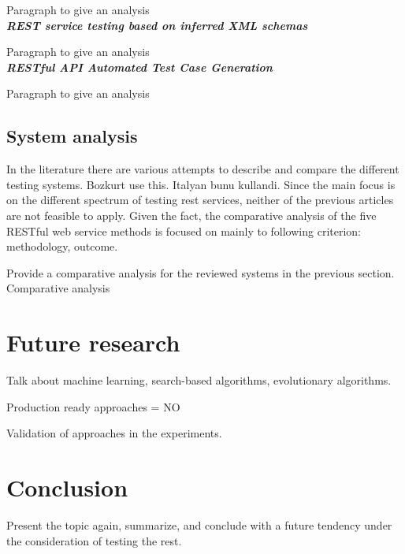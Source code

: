 \documentclass[english]{tktltiki}
\begin{document}
Paragraph to give an analysis 
\\

\textit{\textbf{REST service testing based on inferred XML schemas \cite{navas2014rest}}}

Paragraph to give an analysis 
\\

\textit{\textbf{RESTful API Automated Test Case Generation \cite{arcuri2017restful}}}

Paragraph to give an analysis

\subsection{System analysis}
In the literature there are various attempts to describe and compare the different testing systems. Bozkurt use this. Italyan bunu kullandi. Since the main focus is on the different spectrum of testing rest services, neither of the previous articles are not feasible to apply. Given the fact, the comparative analysis of the five RESTful web service methods is focused on mainly to following criterion: methodology, outcome.

Provide a comparative analysis for the reviewed systems in the previous section. Comparative analysis

\section{Future research}
Talk about machine learning, search-based algorithms, evolutionary algorithms.

Production ready approaches = NO

Validation of approaches in the experiments. 

\section{Conclusion}
Present the topic again, summarize, and conclude with a future tendency under the consideration of testing the rest.

\newpage
\nocite{*}
%
%


%



\lastpage
\end{document}
